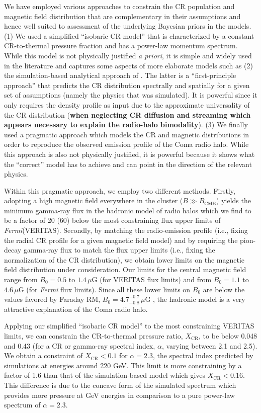 \documentclass[12pt,manuscript]{aastex}
\def\Fermi{{\em Fermi}\xspace}
\newcommand{\rmn}{\mathrm}
\newcommand{\CR}{\mathrm{CR}}
\begin{document}
We have employed various approaches to constrain the CR population and magnetic field distribution
that are complementary in their assumptions and hence well suited to assessment of the underlying
Bayesian priors in the models. (1) We used a simplified ``isobaric CR model'' that is characterized
by a constant CR-to-thermal pressure fraction and has a power-law momentum spectrum. While this
model is not physically justified {\em a priori}, it is simple and widely used in the literature and
captures some aspects of more elaborate models such as (2) the simulation-based analytical approach 
of \citet{article:PinzkePfrommer:2010}. The latter is a ``first-principle approach'' that predicts
the CR distribution spectrally and spatially for a given set of assumptions (namely the physics
that was simulated). It is powerful since it only requires the density profile as input due to the
approximate universality of the CR distribution ({\bf when neglecting CR diffusion and streaming which
appears necessary to explain the radio-halo bimodality}). (3) We finally used a pragmatic
approach which models the CR and magnetic distributions in order to reproduce the observed emission
profile of the Coma radio halo. While this approach is also not physically justified, it is
powerful because it shows what the ``correct'' model has to achieve and can point in the
direction of the relevant physics.

Within this pragmatic approach, we employ two different methods. Firstly, adopting a high magnetic
field everywhere in the cluster ($B\gg B_\rmn{CMB}$) yields the minimum gamma-ray flux in the
hadronic model of radio halos which we find to be a factor of 20 (60) below the most constraining
flux upper limits of \Fermi (VERITAS). Secondly, by matching the radio-emission profile (i.e.,
fixing the radial CR profile for a given magnetic field model) and by requiring the pion-decay
gamma-ray flux to match the flux upper limits (i.e., fixing the normalization of the CR
distribution), we obtain lower limits on the magnetic field distribution under consideration. Our
limits for the central magnetic field range from $B_{0} = 0.5$ to $1.4\,\mu$G (for VERITAS  flux
limits) and from $B_{0} = 1.1$ to $4.6\,\mu$G (for \Fermi flux limits). Since all these lower
limits on $B_0$ are below the values favored by Faraday RM, $B_{0} = 4.7^{+0.7}_{-0.8}\,\mu$G
\citep{article:Bonafede_etal:2010}, the hadronic model is a very attractive explanation of the Coma
radio halo.

Applying our simplified ``isobaric CR model'' to the most constraining VERITAS limits, we can
constrain the CR-to-thermal pressure ratio, $X_\CR$, to be below 0.048 and 0.43 (for a CR or
gamma-ray spectral index, $\alpha$, varying between 2.1 and 2.5). We obtain a constraint of
$X_\CR<0.1$ for $\alpha=2.3$, the spectral index predicted by simulations at energies around 220
GeV. This limit is
more constraining by a factor of 1.6 than that of the simulation-based model which gives
$X_\CR<0.16$. This difference is due to the concave form of the simulated spectrum which provides
more pressure at GeV energies in comparison to a pure power-law spectrum of $\alpha=2.3$.
\end{document}
